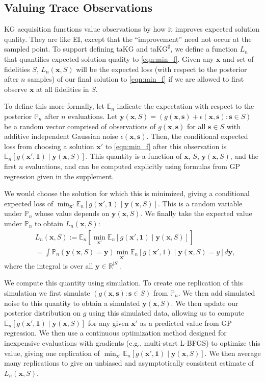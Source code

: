 \documentclass[letterpaper]{article}
\newcommand{\E}{\mathbb{E}}
\newcommand{\x}{\mathbf{x}}
\newcommand{\s}{\mathbf{s}}
\newcommand{\Y}{\mathbf{y}}
\renewcommand{\S}{S}
\newcommand{\one}{\mathbf{1}}
\newcommand{\eps}{\epsilon}
\newcommand{\loss}{L}
\newcommand{\taKG}{\text{taKG}}
\newcommand{\taKGE}{\text{taKG}^\emptyset}
\numberwithin{equation}{section}
\begin{document}
\subsection{Valuing Trace Observations}
\label{sect:valuing}

KG acquisition functions \citep{frazier2009knowledge} value observations by how it improves expected solution quality.  They are like EI, except that the ``improvement'' need not occur at the sampled point.
To support defining $\taKG$ and $\taKGE$, 
we define a function $\loss_n$ that quantifies expected solution quality to \eqref{eqn:min_f}.
Given any $\x$ and set of fidelities $\S$, 
$\loss_n(\x,\S)$ will be the expected loss (with respect to the posterior after $n$ samples) of our final solution to \eqref{eqn:min_f} if we are allowed to first observe $\x$ at all fidelities in $\S$.

To define this more formally, 
let $\E_n$ indicate the expectation with respect to the posterior $\mathbb{P}_n$ after $n$ evaluations.  
Let $\Y(\x,\S) = ( g(\x,\s) + \eps(\x,\s) : \s \in \S)$ be a random vector comprised of observations of $g(\x,\s)$ for all $\s \in \S$ with additive independent Gaussian noise $\eps(\x,\s)$.
Then, the conditional expected loss from choosing a solution $\x'$ to \eqref{eqn:min_f} after this observation is $\E_n\left[g(\x',\one) \mid \Y(\x,\S)\right]$.  
This quantity is a function of $\x$, $\S$, $\Y(\x,\S)$, and the first $n$ evaluations, and 
can be computed explicitly using formulas from GP regression given in the supplement.

We would choose the solution for which this is minimized, giving a conditional expected loss of $\min_{\x'} \E_n\left[g(\x',\one) \mid \Y(\x,\S) \right]$. This is a random variable under $\mathbb{P}_n$ whose value depends on $\Y(\x,\S)$.
We finally take the expected value under $\mathbb{P}_n$ to obtain $\loss_n(\x,\S)$:
\begin{equation*} 
\begin{split}
&\loss_n(\x,\S) := \E_n\left[ \min_{\x'} \E_n\left[g(\x',\one) \mid \Y(\x,\S) \right]\right] \\
&=\!\int\!\mathbb{P}_n\left(\Y(\x,\S)\!=\!\Y\right) \min_{\x'} \E_n\left[g(\x',1)\!\mid\!\Y(\x,\S)\!=\!y \right] d\Y,
\end{split}
\end{equation*}
where the integral is over all $\Y \in \mathbb{R}^{|\S|}$.

We compute this quantity using simulation.  To create one replication of this simulation we first simulate $(g(\x,\s) : \s \in S)$ from $\mathbb{P}_n$.  We then add simulated noise to this quantity to obtain a simulated $\Y(\x,\S)$.  We then update our posterior distribution on $g$ using this simulated data, allowing us to compute $\E_n\left[g(\x',\one) \mid \Y(\x,\S)\right]$ for any given $\x'$ as a predicted value from GP regression.
We then use a continuous optimization method designed for inexpensive evaluations with gradients (e.g., multi-start L-BFGS) to optimize this value, giving one replication of $\min_{\x'} \E_n\left[g(\x',\one) \mid \Y(\x,\S)\right]$.  We then average many replications to give an unbiased and asymptotically consistent estimate of $\loss_n(\x,\S)$.
\end{document}
